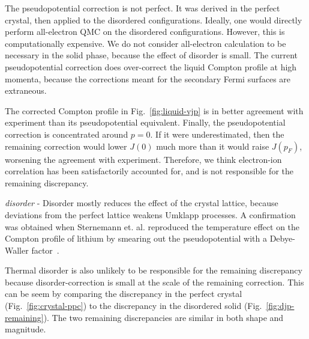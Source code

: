 \documentclass[aps,prb,showpacs,preprintnumbers,amsmath,amssymb,superscriptaddress,twocolumn]{revtex4}
\begin{document}
The pseudopotential correction is not perfect. It was derived in the perfect crystal, then applied to the disordered configurations. Ideally, one would directly perform all-electron QMC on the disordered configurations. However, this is computationally expensive. We do not consider all-electron calculation to be necessary in the solid phase, because the effect of disorder is small. The current pseudopotential correction does over-correct the liquid Compton profile at high momenta, because the corrections meant for the secondary Fermi surfaces are extraneous.

The corrected Compton profile in Fig.~\ref{fig:liquid-vjp} is in better agreement with experiment than its pseudopotential equivalent. Finally, the pseudopotential correction is concentrated around $p=0$. If it were underestimated, then the remaining correction would lower $J(0)$ much more than it would raise $J(p_F)$, worsening the agreement with experiment. Therefore, we think electron-ion correlation has been satisfactorily accounted for, and is not responsible for the remaining discrepancy.

\emph{disorder} - Disorder mostly reduces the effect of the crystal lattice, because deviations from the perfect lattice weakens Umklapp processes. A confirmation was obtained when Sternemann et. al. reproduced the temperature effect on the Compton profile of lithium by smearing out the pseudopotential with a Debye-Waller factor~\cite{Sternemann2001}.

Thermal disorder is also unlikely to be responsible for the remaining discrepancy because disorder-correction is small at the scale of the remaining correction. This can be seem by comparing the discrepancy in the perfect crystal (Fig.~\ref{fig:crystal-ppc}) to the discrepancy in the disordered solid (Fig.~\ref{fig:djp-remaining}). The two remaining discrepancies are similar in both shape and magnitude.

\end{document}

